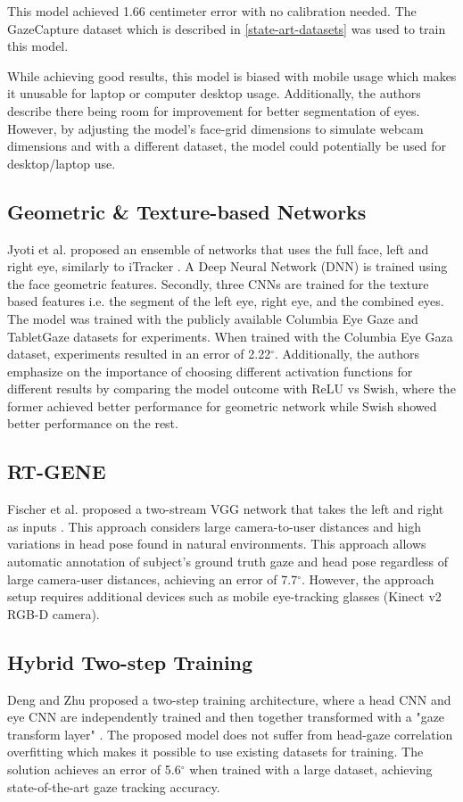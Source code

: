 This model achieved 1.66 centimeter error with no calibration needed. The GazeCapture dataset which is described in \autoref{state-art-datasets} was used to train this model.

While achieving good results, this model is biased with mobile usage which makes it unusable for laptop or computer desktop usage. Additionally, the authors describe there being room for improvement for better segmentation of eyes. However, by adjusting the model's face-grid dimensions to simulate webcam dimensions and with a different dataset, the model could potentially be used for desktop/laptop use.

\subsection{Geometric \& Texture-based Networks}
Jyoti et al. proposed an ensemble of networks that uses the full face, left and right eye, similarly to iTracker \cite{deng_monocular_2017}.
A Deep Neural Network (DNN) is trained using the face geometric features. Secondly, three CNNs are trained for the texture based features i.e. the segment of the left eye, right eye, and the combined eyes. The model was trained with the publicly available Columbia Eye Gaze and TabletGaze datasets for experiments. When trained with the Columbia Eye Gaza dataset, experiments resulted in an error of 2.22$^{\circ}$. Additionally, the authors emphasize on the importance of choosing
different activation functions for different results by comparing the model outcome with ReLU vs Swish, where the former achieved better performance for geometric network while Swish showed better performance on the rest.

\subsection{RT-GENE}
Fischer et al. proposed a two-stream VGG network that takes the left and right as inputs \cite{fischer_rt-gene_2018}. This approach considers large camera-to-user distances and high variations in head pose found in natural environments. This approach allows automatic annotation of subject's ground truth gaze and head pose regardless of large camera-user distances, achieving an error of 7.7$^{\circ}$. However, the approach setup requires additional devices such as mobile eye-tracking glasses (Kinect v2 RGB-D camera).

\subsection{Hybrid Two-step Training}
Deng and Zhu proposed a two-step training architecture, where a head CNN and eye CNN are independently trained and then together transformed with a "gaze transform layer" \cite{deng_monocular_2017}. The proposed model does not suffer from head-gaze correlation overfitting which makes it possible to use existing datasets for training. The solution achieves an error of 5.6$^{\circ}$ when trained with a large dataset, achieving state-of-the-art gaze tracking accuracy. 

